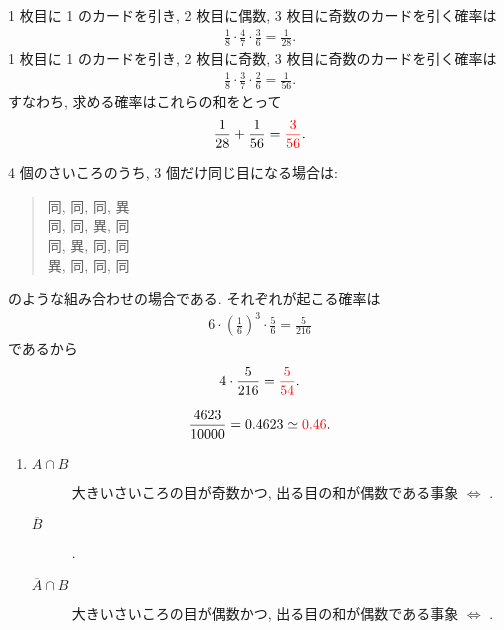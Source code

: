 \begin{qenumerate}
{\begin{enumerate}
{				1 枚目に 1 のカードを引き, 2 枚目に偶数, 3 枚目に奇数のカードを引く確率は
				\begin{align}
					\frac{1}{8}\cdot\frac{4}{7}\cdot\frac{3}{6} = \frac{1}{28}.
				\end{align}
				1 枚目に 1 のカードを引き, 2 枚目に奇数, 3 枚目に奇数のカードを引く確率は
				\begin{align}
					\frac{1}{8}\cdot\frac{3}{7}\cdot\frac{2}{6} = \frac{1}{56}.
				\end{align}
				すなわち, 求める確率はこれらの和をとって
				\begin{align}
					\frac{1}{28} + \frac{1}{56} = \textcolor{red}{\frac{3}{56}}.
				\end{align}
			}
		\end{enumerate}
	}
	\item{
		4 個のさいころのうち, 3 個だけ同じ目になる場合は: 
		\begin{quote}
			同, 同, 同, 異 \\
			同, 同, 異, 同 \\
			同, 異, 同, 同 \\
			異, 同, 同, 同
		\end{quote}
		のような組み合わせの場合である.
		それぞれが起こる確率は
		\begin{align}
			6\cdot\left(\frac{1}{6}\right)^{3}\cdot\frac{5}{6} = \frac{5}{216}
		\end{align}
		であるから
		\begin{align}
			4\cdot\frac{5}{216} = \textcolor{red}{\frac{5}{54}}.
		\end{align}
	}
	\item{
		\begin{align}
			\frac{4623}{10000} = 0.4623 \simeq \textcolor{red}{0.46}.
		\end{align}
	}
	\item{
		\begin{enumerate}
			\item{
				\begin{description}
					\item[$A \cap B$]{
						大きいさいころの目が奇数かつ, 出る目の和が偶数である事象 $\Leftrightarrow$ .
					}
					\item[$\overline{B}$]{
						.
					}
					\item[$\overline{A} \cap B$]{
						大きいさいころの目が偶数かつ, 出る目の和が偶数である事象 $\Leftrightarrow$ .
}
\end{description}}
\end{enumerate}}
\end{qenumerate}
